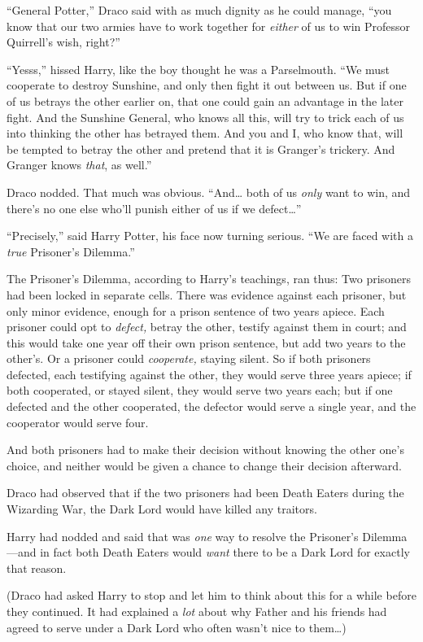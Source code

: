 ``General Potter,'' Draco said with as much dignity as he could manage,
``you know that our two armies have to work together for \emph{either}
of us to win Professor Quirrell's wish, right?''

``Yesss,'' hissed Harry, like the boy thought he was a Parselmouth. ``We
must cooperate to destroy Sunshine, and only then fight it out between
us. But if one of us betrays the other earlier on, that one could gain
an advantage in the later fight. And the Sunshine General, who knows all
this, will try to trick each of us into thinking the other has betrayed
them. And you and I, who know that, will be tempted to betray the other
and pretend that it is Granger's trickery. And Granger knows
\emph{that}, as well.''

Draco nodded. That much was obvious. ``And\ldots{} both of us
\emph{only} want to win, and there's no one else who'll punish either of
us if we defect\ldots{}''

``Precisely,'' said Harry Potter, his face now turning serious. ``We are
faced with a \emph{true} Prisoner's Dilemma.''

The Prisoner's Dilemma, according to Harry's teachings, ran thus: Two
prisoners had been locked in separate cells. There was evidence against
each prisoner, but only minor evidence, enough for a prison sentence of
two years apiece. Each prisoner could opt to \emph{defect,} betray the
other, testify against them in court; and this would take one year off
their own prison sentence, but add two years to the other's. Or a
prisoner could \emph{cooperate,} staying silent. So if both prisoners
defected, each testifying against the other, they would serve three
years apiece; if both cooperated, or stayed silent, they would serve two
years each; but if one defected and the other cooperated, the defector
would serve a single year, and the cooperator would serve four.

And both prisoners had to make their decision without knowing the other
one's choice, and neither would be given a chance to change their
decision afterward.

Draco had observed that if the two prisoners had been Death Eaters
during the Wizarding War, the Dark Lord would have killed any traitors.

Harry had nodded and said that was \emph{one} way to resolve the
Prisoner's Dilemma---and in fact both Death Eaters would \emph{want}
there to be a Dark Lord for exactly that reason.

(Draco had asked Harry to stop and let him to think about this for a
while before they continued. It had explained a \emph{lot} about why
Father and his friends had agreed to serve under a Dark Lord who often
wasn't nice to them\ldots{})

